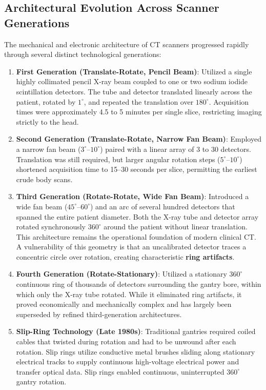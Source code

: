 \documentclass[11pt,a4paper]{article}
\begin{document}
\subsection{Architectural Evolution Across Scanner Generations}
The mechanical and electronic architecture of CT scanners progressed rapidly through several distinct technological generations:
\begin{enumerate}[leftmargin=*]
    \item \textbf{First Generation (Translate-Rotate, Pencil Beam)}: Utilized a single highly collimated pencil X-ray beam coupled to one or two sodium iodide scintillation detectors. The tube and detector translated linearly across the patient, rotated by $1^\circ$, and repeated the translation over $180^\circ$. Acquisition times were approximately 4.5 to 5 minutes per single slice, restricting imaging strictly to the head.
    \item \textbf{Second Generation (Translate-Rotate, Narrow Fan Beam)}: Employed a narrow fan beam ($3^\circ\text{--}10^\circ$) paired with a linear array of 3 to 30 detectors. Translation was still required, but larger angular rotation steps ($5^\circ\text{--}10^\circ$) shortened acquisition time to 15--30 seconds per slice, permitting the earliest crude body scans.
    \item \textbf{Third Generation (Rotate-Rotate, Wide Fan Beam)}: Introduced a wide fan beam ($45^\circ\text{--}60^\circ$) and an arc of several hundred detectors that spanned the entire patient diameter. Both the X-ray tube and detector array rotated synchronously $360^\circ$ around the patient without linear translation. This architecture remains the operational foundation of modern clinical CT. A vulnerability of this geometry is that an uncalibrated detector traces a concentric circle over rotation, creating characteristic \textbf{ring artifacts}.
    \item \textbf{Fourth Generation (Rotate-Stationary)}: Utilized a stationary $360^\circ$ continuous ring of thousands of detectors surrounding the gantry bore, within which only the X-ray tube rotated. While it eliminated ring artifacts, it proved economically and mechanically complex and has largely been superseded by refined third-generation architectures.
    \item \textbf{Slip-Ring Technology (Late 1980s)}: Traditional gantries required coiled cables that twisted during rotation and had to be unwound after each rotation. Slip rings utilize conductive metal brushes sliding along stationary electrical tracks to supply continuous high-voltage electrical power and transfer optical data. Slip rings enabled continuous, uninterrupted $360^\circ$ gantry rotation.

\end{enumerate}
\end{document}
